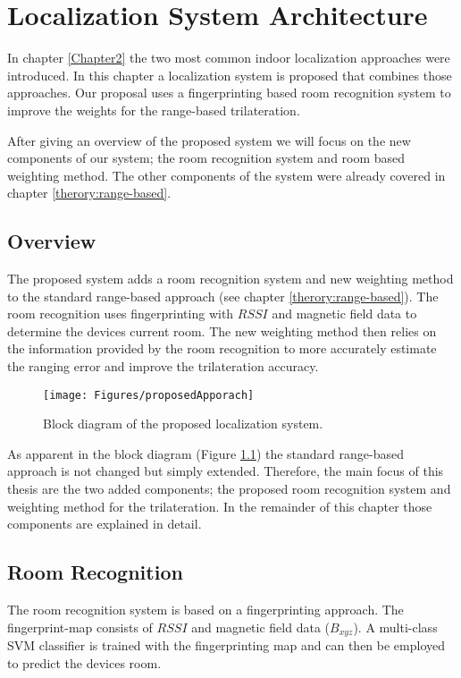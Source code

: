 \chapter{Localization System Architecture}

\label{Chapter3}

In chapter \ref{Chapter2} the two most common indoor localization approaches were introduced. In this chapter a localization system is proposed that combines those approaches. Our proposal uses a fingerprinting based room recognition system to improve the weights for the range-based trilateration.

After giving an overview of the proposed system we will focus on the new components of our system; the room recognition system and room based weighting method. The other components of the system were already covered in chapter \ref{therory:range-based}.

\section{Overview}
The proposed system adds a room recognition system and new weighting method to the standard range-based approach (see chapter \ref{therory:range-based}). The room recognition uses fingerprinting with $RSSI$ and magnetic field data to determine the devices current room. The new weighting method then relies on the information provided by the room recognition to more accurately estimate the ranging error and improve the trilateration accuracy.

\begin{figure}[ht]
\centering
\texttt{[image: Figures/proposedApporach]}
\decoRule
\caption[Proposed localization system]{Block diagram of the proposed localization system.}
\label{fig:proposedApproach}
\end{figure}

As apparent in the block diagram (Figure \ref{fig:proposedApproach}) the standard range-based approach is not changed but simply extended. Therefore, the main focus of this thesis are the two added components; the proposed room recognition system and weighting method for the trilateration. In the remainder of this chapter those components are explained in detail.

\section{Room Recognition}
The room recognition system is based on a fingerprinting approach. The fingerprint-map consists of $RSSI$ and magnetic field data ($B_{xyz}$). A multi-class SVM classifier is trained with the fingerprinting map and can then be employed to predict the devices room.

